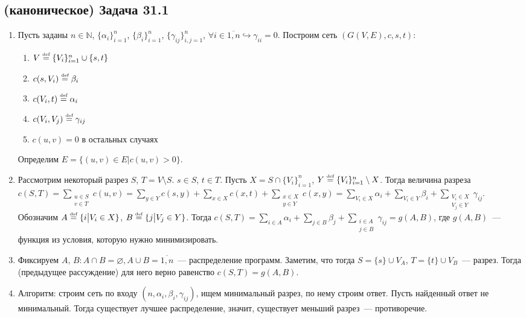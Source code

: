 \documentclass[a4paper]{article}
\def\eqdef{\overset{\mbox{\tiny def}}{=}}
\begin{document}
\subsection*{(каноническое) Задача 31.1}
\begin{enumerate}
\item Пусть заданы $n\in\mathbb{N}$, $\{\alpha_i\}_{i=1}^n$, $\{\beta_i\}_{i=1}^n$, $\{\gamma_{ij}\}_{i,j=1}^{n}$, $\forall i\in\overline{1,n}\hookrightarrow\gamma_{ii}=0$. Построим сеть $(G(V,E),c,s,t)$:\begin{enumerate}
\item $V\eqdef\{V_i\}_{i=1}^n\cup\{s,t\}$
\item $c(s,V_i)\eqdef \beta_i$
\item $c(V_i,t)\eqdef \alpha_i$
\item $c(V_i,V_j)\eqdef \gamma_{ij}$
\item $c(u,v)=0$ в остальных случаях
\end{enumerate}
Определим $E=\{(u,v)\in E\big|c(u,v)>0\}$.
\item Рассмотрим некоторый разрез $S$, $T=V\setminus S$. $s\in S$, $t\in T$. Пусть $X=S\cap\{V_i\}_{i=1}^n$, $Y\eqdef\{V_i\}_{i=1}^n\setminus X$. Тогда величина разреза $c(S,T)=\sum\limits_{\substack{u\in S\\v\in T}}c(u,v)=\sum\limits_{y\in Y}c(s,y)+\sum\limits_{x\in X}c(x,t)+\sum\limits_{\substack{x\in X\\y\in Y}}c(x,y)=\sum\limits_{V_i\in X}\alpha_i+\sum\limits_{V_i\in Y}\beta_i+\sum\limits_{\substack{V_i\in X\\V_j\in Y}}\gamma_{ij}$. Обозначим $A\eqdef\{i\big|V_i\in X\}$, $B\eqdef\{j\big|V_j\in Y\}$. Тогда $c(S,T)=\sum\limits_{i\in A}\alpha_i+\sum\limits_{j\in B}\beta_j+\sum\limits_{\substack{i\in A\\j\in B}}\gamma_{ij}=g(A,B)$, где $g(A,B)$~--- функция из условия, которую нужно минимизировать.
\item Фиксируем $A,\,B\colon A\cap B=\varnothing, A\cup B=\overline{1,n}$~--- распределение программ. Заметим, что тогда $S=\{s\}\cup V_A$, $T=\{t\}\cup V_B$~--- разрез. Тогда (предыдущее рассуждение) для него верно равенство $c(S,T)=g(A,B)$.
\item Алгоритм: строим сеть по входу $(n,\alpha_i,\beta_i,\gamma_{ij})$, ищем минимальный разрез, по нему строим ответ. Пусть найденный ответ не минимальный. Тогда существует лучшее распределение, значит, существует меньший разрез~--- противоречие.
\end{enumerate}
\end{document}
